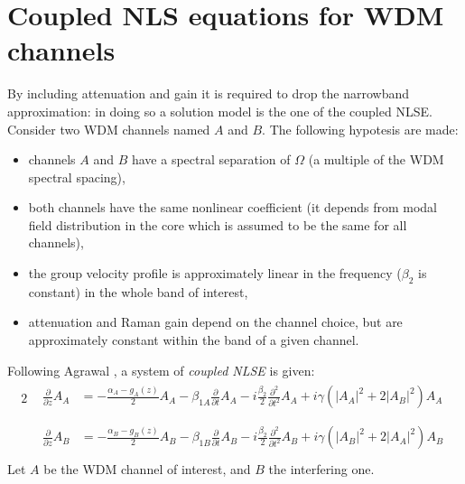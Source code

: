 \documentclass[10pt, lettersize, journal, onecolumn]{IEEEtran}
\begin{document}
\section{Coupled NLS equations for WDM channels} \label{framework}
By including attenuation and gain it is required to drop the narrowband approximation: in doing so a solution model is the one of the coupled NLSE.\\
Consider two WDM channels named $A$ and $B$.
The following hypotesis are made:
\begin{itemize}
 \item channels $A$ and $B$ have a spectral separation of $\Omega$ (a multiple of the WDM spectral spacing),
 \item both channels have the same nonlinear coefficient (it depends from modal field distribution in the core which is assumed to be the same for all channels),
 \item the group velocity profile is approximately linear in the frequency ($\beta_2$ is constant) in the whole band of interest,
 \item attenuation and Raman gain depend on the channel choice, but are approximately constant within the band of a given channel.
\end{itemize}
Following Agrawal \cite[p.263]{Agrawal}, a system of \textit{coupled NLSE} is given:
\begin{alignat}{2}
    &\begin{aligned}
        \frac{\partial}{\partial z} A_A &= -\frac{\alpha_A - g_A(z)}{2}A_A - \beta_{1A} \frac{\partial}{\partial t} A_A -  i \frac{\beta_2}{2} \frac{\partial^2}{\partial t^2} A_A + i \gamma (|A_A|^2 +2 |A_B|^2)A_A \\
    \end{aligned}\label{eq:nlA} \\
    &\begin{aligned}
        \frac{\partial}{\partial z} A_B &= -\frac{\alpha_B - g_B(z)}{2}A_B - \beta_{1B} \frac{\partial}{\partial t} A_B - i \frac{\beta_2}{2} \frac{\partial^2}{\partial t^2} A_B + i \gamma (|A_B|^2 +2 |A_A|^2)A_B \\
    \end{aligned}\label{eq:nlB}
\end{alignat}
Let $A$ be the WDM channel of interest, and $B$ the interfering one.
\end{document}
